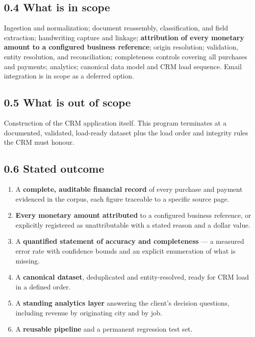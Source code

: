 \documentclass[
]{article}
\providecommand{\tightlist}{%
  \setlength{\itemsep}{0pt}\setlength{\parskip}{0pt}}
\begin{document}
\subsection{0.4 What is in scope}\label{what-is-in-scope}

Ingestion and normalization; document reassembly, classification, and
field extraction; handwriting capture and linkage; \textbf{attribution
of every monetary amount to a configured business reference}; origin
resolution; validation, entity resolution, and reconciliation;
completeness controls covering all purchases and payments; analytics;
canonical data model and CRM load sequence. Email integration is in
scope as a deferred option.

\subsection{0.5 What is out of scope}\label{what-is-out-of-scope}

Construction of the CRM application itself. This program terminates at a
documented, validated, load-ready dataset plus the load order and
integrity rules the CRM must honour.

\subsection{0.6 Stated outcome}\label{stated-outcome}

\begin{enumerate}
\def\labelenumi{\arabic{enumi}.}
\tightlist
\item
  A \textbf{complete, auditable financial record} of every purchase and
  payment evidenced in the corpus, each figure traceable to a specific
  source page.
\item
  \textbf{Every monetary amount attributed} to a configured business
  reference, or explicitly registered as unattributable with a stated
  reason and a dollar value.
\item
  A \textbf{quantified statement of accuracy and completeness} --- a
  measured error rate with confidence bounds and an explicit enumeration
  of what is missing.
\item
  A \textbf{canonical dataset}, deduplicated and entity-resolved, ready
  for CRM load in a defined order.
\item
  A \textbf{standing analytics layer} answering the client's decision
  questions, including revenue by originating city and by job.
\item
  A \textbf{reusable pipeline} and a permanent regression test set.
\end{enumerate}
\end{document}
